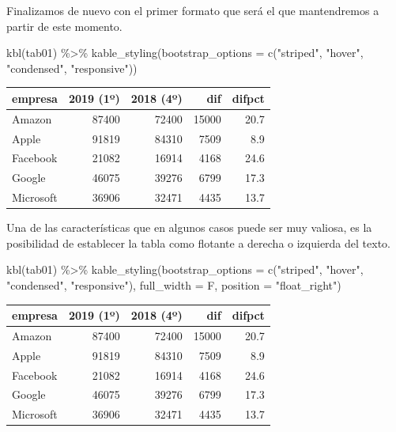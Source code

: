 \documentclass[
]{book}
\newenvironment{Shaded}{\begin{snugshade}}{\end{snugshade}}
\newcommand{\AttributeTok}[1]{\textcolor[rgb]{0.77,0.63,0.00}{#1}}
\newcommand{\FunctionTok}[1]{\textcolor[rgb]{0.00,0.00,0.00}{#1}}
\newcommand{\NormalTok}[1]{#1}
\newcommand{\SpecialCharTok}[1]{\textcolor[rgb]{0.00,0.00,0.00}{#1}}
\newcommand{\StringTok}[1]{\textcolor[rgb]{0.31,0.60,0.02}{#1}}
\begin{document}
Finalizamos de nuevo con el primer formato que será el que mantendremos a partir de este momento.

\begin{Shaded}
\begin{Highlighting}[]
\FunctionTok{kbl}\NormalTok{(tab01) }\SpecialCharTok{\%\textgreater{}\%} \FunctionTok{kable\_styling}\NormalTok{(}\AttributeTok{bootstrap\_options =} \FunctionTok{c}\NormalTok{(}\StringTok{"striped"}\NormalTok{, }
  \StringTok{"hover"}\NormalTok{, }\StringTok{"condensed"}\NormalTok{, }\StringTok{"responsive"}\NormalTok{))}
\end{Highlighting}
\end{Shaded}

\begin{table}
\centering
\begin{tabular}[t]{l|r|r|r|r}
\hline
empresa & 2019 (1º) & 2018 (4º) & dif & difpct\\
\hline
Amazon & 87400 & 72400 & 15000 & 20.7\\
\hline
Apple & 91819 & 84310 & 7509 & 8.9\\
\hline
Facebook & 21082 & 16914 & 4168 & 24.6\\
\hline
Google & 46075 & 39276 & 6799 & 17.3\\
\hline
Microsoft & 36906 & 32471 & 4435 & 13.7\\
\hline
\end{tabular}
\end{table}

Una de las características que en algunos casos puede ser muy valiosa, es la posibilidad de establecer la tabla como flotante a derecha o izquierda del texto.

\begin{Shaded}
\begin{Highlighting}[]
\FunctionTok{kbl}\NormalTok{(tab01) }\SpecialCharTok{\%\textgreater{}\%} \FunctionTok{kable\_styling}\NormalTok{(}\AttributeTok{bootstrap\_options =} \FunctionTok{c}\NormalTok{(}\StringTok{"striped"}\NormalTok{, }
  \StringTok{"hover"}\NormalTok{, }\StringTok{"condensed"}\NormalTok{, }\StringTok{"responsive"}\NormalTok{), }\AttributeTok{full\_width =}\NormalTok{ F, }
  \AttributeTok{position =} \StringTok{"float\_right"}\NormalTok{)}
\end{Highlighting}
\end{Shaded}

\begin{table}
\begin{tabular}[t]{l|r|r|r|r}
\hline
empresa & 2019 (1º) & 2018 (4º) & dif & difpct\\
\hline
Amazon & 87400 & 72400 & 15000 & 20.7\\
\hline
Apple & 91819 & 84310 & 7509 & 8.9\\
\hline
Facebook & 21082 & 16914 & 4168 & 24.6\\
\hline
Google & 46075 & 39276 & 6799 & 17.3\\
\hline
Microsoft & 36906 & 32471 & 4435 & 13.7\\
\hline
\end{tabular}\end{table}
\end{document}
